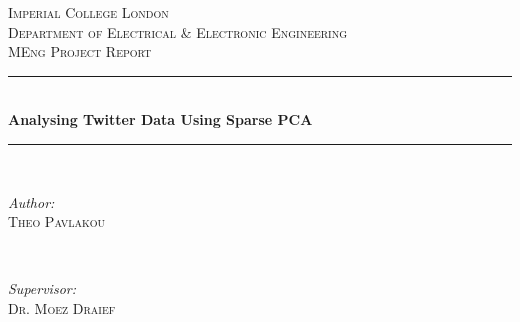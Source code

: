 \documentclass[11pt,a4paper]{article}
\begin{document}
\begin{titlepage}

\newcommand{\HRule}{\rule{\linewidth}{0.5mm}} %

\center %
 

\textsc{\LARGE Imperial College London}\\[1.5cm] %
\textsc{\Large Department of Electrical \& Electronic Engineering}\\[0.5cm] %
\textsc{\large MEng Project Report}\\[0.5cm] %


\HRule \\[0.4cm]
{ \huge \bfseries Analysing Twitter Data Using Sparse PCA}\\[0.4cm] %
\HRule \\[1.5cm]
 

\begin{minipage}{0.4\textwidth}
\begin{flushleft} \large
\emph{Author:}\\
 \textsc{Theo Pavlakou} %
\end{flushleft}
\end{minipage}
~
\begin{minipage}{0.4\textwidth}
\begin{flushright} \large
\emph{Supervisor:} \\
\textsc{Dr. Moez Draief} %
\end{flushright}
\end{minipage}\\[4cm]



\end{titlepage}
\end{document}
